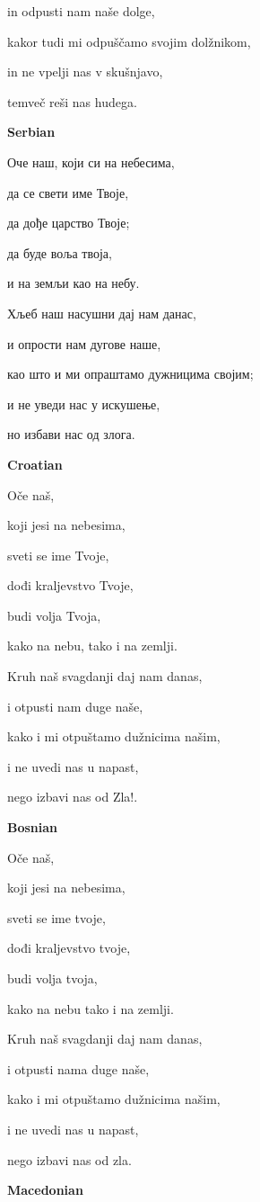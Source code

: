 in odpusti nam naše dolge,

kakor tudi mi odpuščamo svojim dolžnikom,

in ne vpelji nas v skušnjavo, 

temveč reši nas hudega.

\textbf{Serbian}

Оче наш, који си на небесима,

да се свети име Твоје,

да дође царство Твоје;

да буде воља твоја,

и на земљи као на небу.

Хљеб наш насушни дај нам данас,

и опрости нам дугове наше,

као што и ми опраштамо дужницима својим;

и не уведи нас у искушење,

но избави нас од злога.

\textbf{Croatian}

Oče naš,

koji jesi na nebesima, 

sveti se ime Tvoje, 

dođi kraljevstvo Tvoje, 

budi volja Tvoja, 

kako na nebu, tako i na zemlji.

Kruh naš svagdanji daj nam danas, 

i otpusti nam duge naše, 

kako i mi otpuštamo dužnicima našim, 

i ne uvedi nas u napast, 

nego izbavi nas od Zla!. 

\textbf{Bosnian}

Oče naš,

koji jesi na nebesima,

sveti se ime tvoje,

dođi kraljevstvo tvoje,

budi volja tvoja,

kako na nebu tako i na zemlji.

Kruh naš svagdanji daj nam danas,

i otpusti nama duge naše,

kako i mi otpuštamo dužnicima našim,

i ne uvedi nas u napast,

nego izbavi nas od zla.

\textbf{Macedonian}

